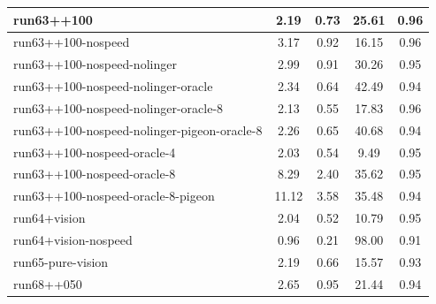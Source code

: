 \begin{longtable}{|l|c|c|c|c|}
run63++100 & {\cellcolor[HTML]{DAEAE6}} \color[HTML]{000000} 2.19 & {\cellcolor[HTML]{EBF2F0}} \color[HTML]{000000} 0.73 & 25.61 & 0.96 \\ \hline
run63++100-nospeed & {\cellcolor[HTML]{CBE3DE}} \color[HTML]{000000} 3.17 & {\cellcolor[HTML]{EBF2F0}} \color[HTML]{000000} 0.92 & 16.15 & 0.96 \\ \hline
run63++100-nospeed-nolinger & {\cellcolor[HTML]{CEE4E0}} \color[HTML]{000000} 2.99 & {\cellcolor[HTML]{EBF2F0}} \color[HTML]{000000} 0.91 & 30.26 & 0.95 \\ \hline
run63++100-nospeed-nolinger-oracle & {\cellcolor[HTML]{D8E9E5}} \color[HTML]{000000} 2.34 & {\cellcolor[HTML]{EBF2F0}} \color[HTML]{000000} 0.64 & 42.49 & 0.94 \\ \hline
run63++100-nospeed-nolinger-oracle-8 & {\cellcolor[HTML]{DBEBE7}} \color[HTML]{000000} 2.13 & {\cellcolor[HTML]{EBF2F0}} \color[HTML]{000000} 0.55 & 17.83 & 0.96 \\ \hline
run63++100-nospeed-nolinger-pigeon-oracle-8 & {\cellcolor[HTML]{D9EAE6}} \color[HTML]{000000} 2.26 & {\cellcolor[HTML]{EBF2F0}} \color[HTML]{000000} 0.65 & 40.68 & 0.94 \\ \hline
run63++100-nospeed-oracle-4 & {\cellcolor[HTML]{DCEBE8}} \color[HTML]{000000} 2.03 & {\cellcolor[HTML]{EBF2F0}} \color[HTML]{000000} 0.54 & 9.49 & 0.95 \\ \hline
run63++100-nospeed-oracle-8 & {\cellcolor[HTML]{7FBEB1}} \color[HTML]{000000} 8.29 & {\cellcolor[HTML]{9ACBC1}} \color[HTML]{000000} 2.40 & 35.62 & 0.95 \\ \hline
run63++100-nospeed-oracle-8-pigeon & {\cellcolor[HTML]{55AA99}} \color[HTML]{F1F1F1} 11.12 & {\cellcolor[HTML]{55AA99}} \color[HTML]{F1F1F1} 3.58 & 35.48 & 0.94 \\ \hline
run64+vision & {\cellcolor[HTML]{DCEBE8}} \color[HTML]{000000} 2.04 & {\cellcolor[HTML]{EBF2F0}} \color[HTML]{000000} 0.52 & 10.79 & 0.95 \\ \hline
run64+vision-nospeed & {\cellcolor[HTML]{EBF2F0}} \color[HTML]{000000} 0.96 & {\cellcolor[HTML]{EBF2F0}} \color[HTML]{000000} 0.21 & 98.00 & 0.91 \\ \hline
run65-pure-vision & {\cellcolor[HTML]{DAEAE6}} \color[HTML]{000000} 2.19 & {\cellcolor[HTML]{EBF2F0}} \color[HTML]{000000} 0.66 & 15.57 & 0.93 \\ \hline
run68++050 & {\cellcolor[HTML]{D4E7E3}} \color[HTML]{000000} 2.65 & {\cellcolor[HTML]{EBF2F0}} \color[HTML]{000000} 0.95 & 21.44 & 0.94 \\ \hline

\end{longtable}
